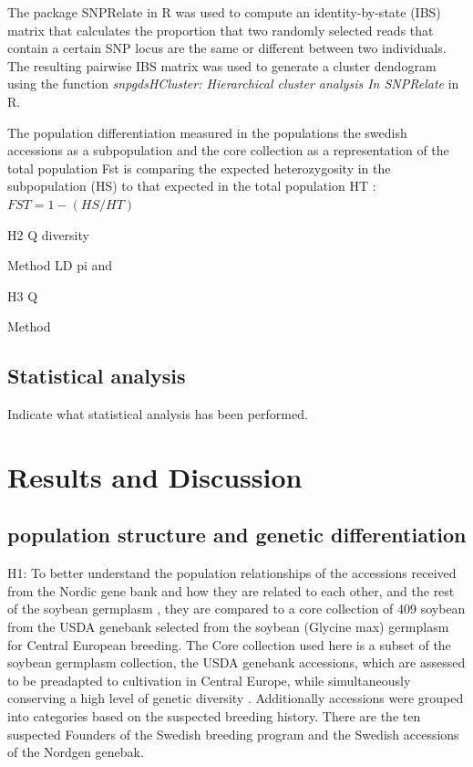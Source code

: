 \documentclass[9pt, onecolumn,twoside]{gsajnl}
\begin{document}
The package SNPRelate in R was used to compute an identity-by-state (IBS) matrix that calculates the proportion that two randomly selected reads that contain a certain SNP locus are the same or different between two individuals. The resulting pairwise IBS matrix was used to generate a cluster dendogram using the function \textit{snpgdsHCluster: Hierarchical cluster analysis In SNPRelate }in R. 

The population differentiation measured in the populations the swedish accessions as a subpopulation and the core collection as a representation of the total population
Fst is comparing the expected heterozygosity in the subpopulation (HS) to that expected in the total population HT :
\(FST =1− (HS/HT)\)


H2 
Q diversity 

Method
LD
pi and 

H3
Q 

Method


\subsection{Statistical analysis}

Indicate what statistical analysis has been performed.


\section{Results and Discussion}
\subsection{population structure and genetic differentiation} 

H1: 
To better understand the population relationships of the accessions received from the Nordic gene bank and how they are related to each other, and the rest of the soybean germplasm , they are compared to a core collection of 409 soybean from the USDA genebank selected from the soybean (Glycine max) germplasm for Central European breeding.  The Core collection used here is a subset of the soybean germplasm collection, the  USDA genebank accessions, which are assessed to be  preadapted to cultivation in Central Europe, while simultaneously conserving a high level of genetic diversity \cite{haupt20}. Additionally accessions were grouped into categories based on the suspected breeding history.  There are the ten suspected Founders of the Swedish breeding program and the Swedish accessions of the Nordgen genebak. 
\end{document}
